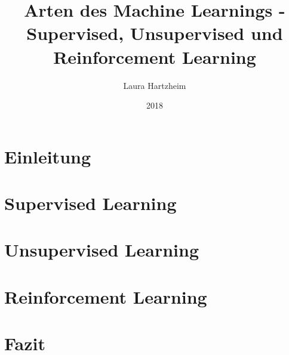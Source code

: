 \documentclass[12pt,titlepage]{scrartcl}
\begin{document}
	
	\begin{titlepage}
		\title{Arten des Machine Learnings - Supervised, Unsupervised und Reinforcement Learning}
		\date{2018}
		\author{Laura Hartzheim}
		\maketitle
	\end{titlepage}
	
	\tableofcontents
	\newpage
	\setcounter{page}{1}
	
	\section{Einleitung}
	
	\newpage
	
	\section{Supervised Learning}
	
	\newpage
	
	\section{Unsupervised Learning}
	
	\newpage
	
	\section{Reinforcement Learning}
	
	\newpage
	
	\section{Fazit}
	
	\newpage
	
	\printbibliography
	
\end{document}
